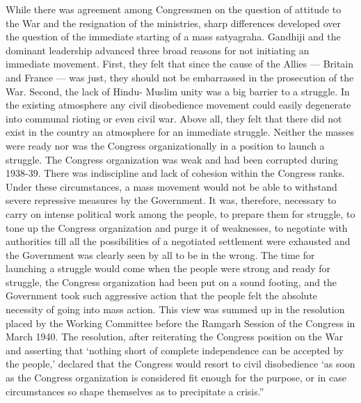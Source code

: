 While there was agreement among Congressmen on the question of attitude to the War and the resignation of the ministries, sharp differences developed over the question of the immediate starting of a mass satyagraha. Gandhiji and the dominant leadership advanced three broad reasons for not initiating an immediate movement. First, they felt that since the cause of the Allies — Britain and France — was just, they should not be embarrassed in the prosecution of the War. Second, the lack of Hindu- Muslim unity was a big barrier to a struggle. In the existing atmosphere any civil disobedience movement could easily degenerate into communal rioting or even civil war. Above all, they felt that there did not exist in the country an atmosphere for an immediate struggle. Neither the masses were ready nor was the Congress organizationally in a position to launch a struggle. The Congress organization was weak and had been corrupted during 1938-39. There was indiscipline and lack of cohesion within the Congress ranks. Under these circumstances, a mass movement would not be able to withstand severe repressive measures by the Government. It was, therefore, necessary to carry on intense political work among the people, to prepare them for struggle, to tone up the Congress organization and purge it of weaknesses, to negotiate with authorities till all the possibilities of a negotiated settlement were exhausted and the Government was clearly seen by all to be in the wrong. The time for launching a struggle would come when the people were strong and ready for struggle, the Congress organization had been put on a sound footing, and the Government took such aggressive action that the people felt the absolute necessity of going into mass action. This view was summed up in the resolution placed by the Working Committee before the Ramgarh Session of the Congress in March 1940. The resolution, after reiterating the Congress position on the War and asserting that ‘nothing short of complete independence can be accepted by the people,’ declared that the Congress would resort to civil disobedience ‘as soon as the Congress organization is considered fit enough for the purpose, or in case circumstances so shape themselves as to precipitate a crisis.” 

